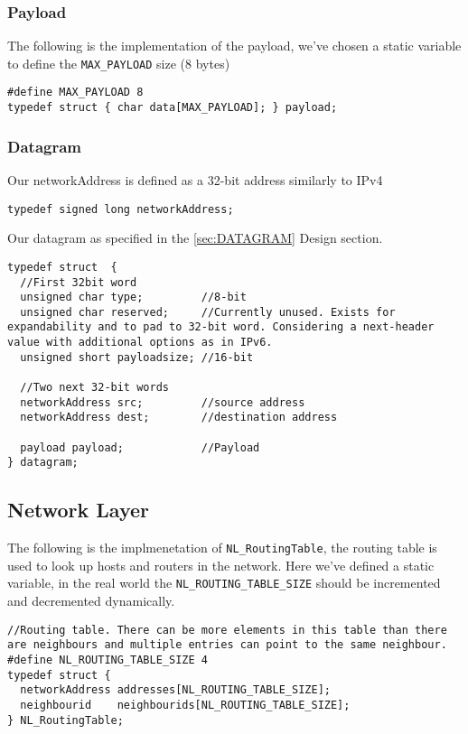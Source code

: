 \subsubsection{Payload}
The following is the implementation of the payload, we've chosen a static variable to define the \texttt{MAX\_PAYLOAD} size (8 bytes)
\begin{lstlisting}
#define MAX_PAYLOAD 8
typedef struct { char data[MAX_PAYLOAD]; } payload;
\end{lstlisting}

\subsubsection{Datagram}

Our networkAddress is defined as a 32-bit address similarly to IPv4
\begin{lstlisting}
typedef signed long networkAddress;
\end{lstlisting}


Our datagram as specified in the \ref{sec:DATAGRAM} Design section.

\begin{lstlisting}
typedef struct  {
  //First 32bit word
  unsigned char type;         //8-bit
  unsigned char reserved;     //Currently unused. Exists for expandability and to pad to 32-bit word. Considering a next-header value with additional options as in IPv6.
  unsigned short payloadsize; //16-bit

  //Two next 32-bit words
  networkAddress src;         //source address
  networkAddress dest;        //destination address

  payload payload;            //Payload
} datagram;
\end{lstlisting}

\subsection{Network Layer}

The following is the implmenetation of \texttt{NL\_RoutingTable}, the routing table is used to look up hosts and routers in the network.
Here we've defined a static variable, in the real world the \texttt{NL\_ROUTING\_TABLE\_SIZE} should be incremented and decremented dynamically.
\begin{lstlisting}
//Routing table. There can be more elements in this table than there are neighbours and multiple entries can point to the same neighbour.
#define NL_ROUTING_TABLE_SIZE 4
typedef struct {
  networkAddress addresses[NL_ROUTING_TABLE_SIZE];
  neighbourid    neighbourids[NL_ROUTING_TABLE_SIZE];
} NL_RoutingTable;
\end{lstlisting}


